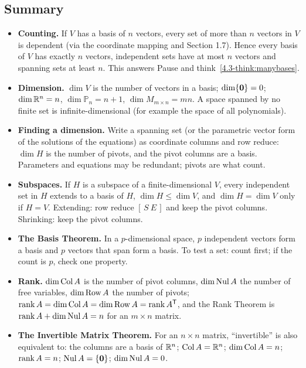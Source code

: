 \documentclass[11pt]{article}
\begin{document}
\subsection*{Summary}
\begin{itemize}
  \item \textbf{Counting.} If $V$ has a basis of $n$ vectors, every set of more than $n$ vectors in $V$ is dependent (via the coordinate mapping and Section 1.7). Hence every basis of $V$ has exactly $n$ vectors, independent sets have at most $n$ vectors and spanning sets at least $n$. This answers Pause and think~\ref{4.3-think:manybases}.
  \item \textbf{Dimension.} $\dim V$ is the number of vectors in a basis; $\dim\{\mathbf{0}\}=0$; $\dim\mathbb{R}^n=n$, $\dim\mathbb{P}_n=n+1$, $\dim M_{m\times n}=mn$. A space spanned by no finite set is infinite-dimensional (for example the space of all polynomials).
  \item \textbf{Finding a dimension.} Write a spanning set (or the parametric vector form of the solutions of the equations) as coordinate columns and row reduce: $\dim H$ is the number of pivots, and the pivot columns are a basis. Parameters and equations may be redundant; pivots are what count.
  \item \textbf{Subspaces.} If $H$ is a subspace of a finite-dimensional $V$, every independent set in $H$ extends to a basis of $H$, $\dim H\le\dim V$, and $\dim H=\dim V$ only if $H=V$. Extending: row reduce $[\,S\ E\,]$ and keep the pivot columns. Shrinking: keep the pivot columns.
  \item \textbf{The Basis Theorem.} In a $p$-dimensional space, $p$ independent vectors form a basis and $p$ vectors that span form a basis. To test a set: count first; if the count is $p$, check one property.
  \item \textbf{Rank.} $\dim\operatorname{Col} A$ is the number of pivot columns, $\dim\operatorname{Nul} A$ the number of free variables, $\dim\operatorname{Row} A$ the number of pivots; $\operatorname{rank} A=\dim\operatorname{Col} A=\dim\operatorname{Row} A=\operatorname{rank} A^{\mathsf T}$, and the Rank Theorem is $\operatorname{rank} A+\dim\operatorname{Nul} A=n$ for an $m\times n$ matrix.
  \item \textbf{The Invertible Matrix Theorem.} For an $n\times n$ matrix, ``invertible'' is also equivalent to: the columns are a basis of $\mathbb{R}^n$; $\operatorname{Col} A=\mathbb{R}^n$; $\dim\operatorname{Col} A=n$; $\operatorname{rank} A=n$; $\operatorname{Nul} A=\{\mathbf{0}\}$; $\dim\operatorname{Nul} A=0$.
\end{itemize}
\end{document}
